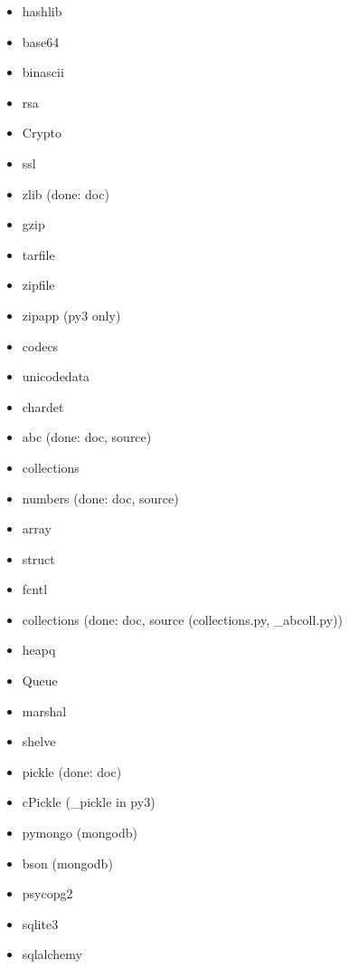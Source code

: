 \documentclass{article}
\begin{document}
\begin{enumerate}
\begin{itemize}
            \item hashlib
            \item base64
            \item binascii
            \item rsa

            \item Crypto
            \item ssl

            \item zlib (done: doc)
            \item gzip
            \item tarfile
            \item zipfile
            \item zipapp (py3 only)

            \item codecs
            \item unicodedata
            \item chardet

            \item abc (done: doc, source)
            \item collections
            \item numbers (done: doc, source)

            \item array
            \item struct
            \item fcntl

            \item collections (done: doc, source (collections.py, _abcoll.py))
            \item heapq
            \item Queue

            \item marshal
            \item shelve
            \item pickle (done: doc)
            \item cPickle (_pickle in py3)
            \item pymongo (mongodb)
            \item bson (mongodb)
            \item psycopg2
            \item sqlite3
            \item sqlalchemy


\end{itemize}
\end{enumerate}
\end{document}
